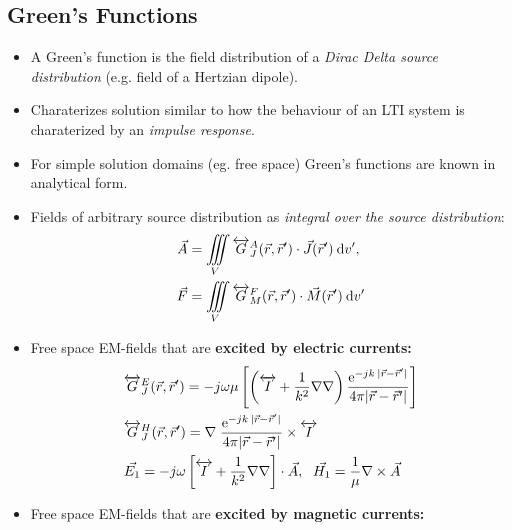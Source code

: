 \subsection{Green's Functions}
\begin{itemize}
    \itemsep0pt
    \item A Green's function is the field distribution of a \textit{Dirac Delta source distribution} (e.g. field of a Hertzian dipole).
    \item Charaterizes solution similar to how the behaviour of an LTI system is charaterized by an \textit{impulse response}.
    \item For simple solution domains (eg. free space) Green's functions are known in analytical form.
    \item Fields of arbitrary source distribution as \textit{integral over the source distribution}:
        \begin{align*}
            \vec{A} &= \iiint\limits_V \overleftrightarrow{G}_J^A(\vec{r},\vec{r}^\prime) \cdot \vec{J}(\vec{r}^\prime)\:\mathrm{d}v^\prime,\\
            \vec{F} &= \iiint\limits_V \overleftrightarrow{G}_M^F(\vec{r},\vec{r}^\prime) \cdot \vec{M}(\vec{r}^\prime)\:\mathrm{d}v^\prime\\
        \end{align*}
    \item Free space EM-fields that are \textbf{excited by electric currents:}\\
        \begin{align*}
            &\overleftrightarrow{G}^E_J(\vec{r},\vec{r}^\prime) = -j\omega\mu\left[\left(\overleftrightarrow{I} + \dfrac{1}{k^2}\nabla\nabla\right) \dfrac{\mathrm{e}^{-jk\:|\vec{r} - \vec{r}^\prime|}}{4\pi|\vec{r} - \vec{r}^\prime|}\right]\\
            &\overleftrightarrow{G}^H_J(\vec{r},\vec{r}^\prime) = \nabla\;\dfrac{\mathrm{e}^{-jk\:|\vec{r} - \vec{r}^\prime|}}{4\pi|\vec{r} - \vec{r}^\prime|} \times \overleftrightarrow{I}\\
            &\vec{E_1} = -j\omega \left[\overleftrightarrow{I} + \dfrac{1}{k^2}\nabla\nabla\right] \cdot \vec{A},\;\
            \vec{H_1} = \dfrac{1}{\mu} \nabla \times \vec{A}
        \end{align*}
    \item Free space EM-fields that are \textbf{excited by magnetic currents:}\\
        \begin{align*}

\end{align*}
\end{itemize}
